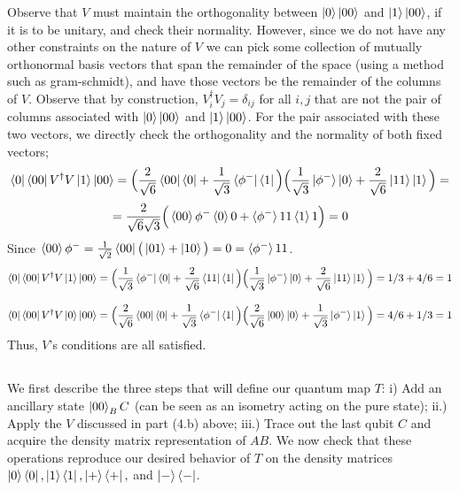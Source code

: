 \documentclass[12pt]{article}
\begin{document}
\begin{enumerate}
Observe that $V$ must maintain the orthogonality between $\ket{0}\ket{00}$ and $\ket{1}\ket{00}$, if it is to be unitary, and check their normality. However, since we do not have any other constraints on the nature of $V$ we can pick some collection of mutually orthonormal basis vectors that span the remainder of the space (using a method such as gram-schmidt), and have those vectors be the remainder of the columns of $V$. Observe that by construction, $V_i^\dagger V_j = \delta_{ij}$ for all $i,j$ that are not the pair of columns associated with $\ket{0}\ket{00}$ and $\ket{1}\ket{00}$. For the pair associated with these two vectors, we directly check the orthogonality and the normality of both fixed vectors;
$$ \bra{0}\bra{00}V^\dagger V\ket{1}\ket{00} = \Big(
\frac{2}{\sqrt{6}} \bra{00}\bra{0} + \frac{1}{\sqrt{3}} \bra{\phi^-}\bra{1}\Big)
\Big(
\frac{1}{\sqrt{3}} \ket{\phi^-}\ket{0} + \frac{2}{\sqrt{6}} \ket{11}\ket{1}\Big) = $$
$$=
\frac{2}{\sqrt{6}\sqrt{3}}  \Big(
\braket{00}{\phi^-}\braket{0}{0} + \braket{\phi^-}{11}\braket{1}{1}\Big) = 0$$
Since $\braket{00}{\phi^-} = \frac{1}{\sqrt{2}}\bra{00} \big( \ket{01} + \ket{10}\big) = 0 =\braket{\phi^-}{11}$.
$$ \bra{0}\bra{00}V^\dagger V\ket{1}\ket{00} = \Big(
\frac{1}{\sqrt{3}} \bra{\phi^-}\bra{0} + \frac{2}{\sqrt{6}} \bra{11}\bra{1}\Big)
\Big(
\frac{1}{\sqrt{3}} \ket{\phi^-}\ket{0} + \frac{2}{\sqrt{6}} \ket{11}\ket{1}\Big) = 1/3 + 4/6 = 1$$

$$ \bra{0}\bra{00}V^\dagger V\ket{0}\ket{00} = \Big(
\frac{2}{\sqrt{6}} \bra{00}\bra{0} + \frac{1}{\sqrt{3}} \bra{\phi^-}\bra{1}\Big)
\Big(
\frac{2}{\sqrt{6}} \ket{00}\ket{0} + \frac{1}{\sqrt{3}} \ket{\phi^-}\ket{1}\Big) = 4/6 + 1/3 = 1 $$
Thus, $V$'s conditions are all satisfied.
\subsection{}

We first describe the three steps that will define our quantum map $T$: i) Add an ancillary state $\ket{00}_BC$ (can be seen as an isometry acting on the pure state); ii.) Apply the $V$ discussed in part (4.b) above; iii.) Trace out the last qubit $C$ and acquire the density matrix representation of $AB$. We now check that these operations reproduce our desired behavior of $T$ on the density matrices $\ket{0}\bra{0}, \ket{1}\bra{1}, \ket{+}\bra{+},$ and $\ket{-}\bra{-}$. 


\end{enumerate}
\end{document}
